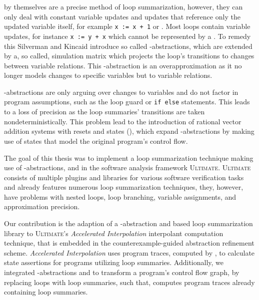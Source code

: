 \qvasr by themselves are a precise method of loop summarization, however, they can only deal with constant variable updates and updates that reference only the updated variable itself, for example \texttt{x := x + 1} or . Most loops contain variable updates, for instance \texttt{x := y + x} which cannot be represented by a \qvasr. To remedy this Silverman and Kincaid introduce so called \qvasr-abstractions, which are \qvasr extended by a, so called, simulation matrix which projects the loop's transitions to changes between variable relations. This \qvasr-abstraction is an overapproximation as it no longer models changes to specific variables but to variable relations.\\ \par

\qvasr-abstractions are only arguing over changes to variables and do not factor in program assumptions, such as the loop guard or \texttt{if else} statements. This leads to a loss of precision as the loop summaries' transitions are taken nondeterministically. This problem lead to the introduction of rational vector addition systems with resets and states (\qvasr), which expand \qvasr-abstractions by making use of states that model the original program's control flow.\\ \par

The goal of this thesis was to implement a loop summarization technique making use of \qvasr-abstractions, and \qvasrs in the software analysis framework \textsc{Ultimate}\cite{Zitat02}.
\textsc{Ultimate} consists of multiple plugins and libraries for various software verification tasks and already features numerous loop summarization techniques, they, however, have problems with nested loops, loop branching, variable assignments, and approximation precision.\\  \par
Our contribution is the adaption of a \qvasr-abstraction and \qvasrs based loop summarization library to \textsc{Ultimate}'s \textsl{Accelerated Interpolation} interpolant computation technique, that is embedded in the \traceabstraction \cite{10.1007/978-3-642-03237-0_7} counterexample-guided abstraction refinement scheme. \textsl{Accelerated Interpolation} uses program traces, computed by \traceabstraction, to calculate state assertions for programs utilizing loop summaries. Additionally, we integrated \qvasr-abstractions and \qvasrs to transform a program's control flow graph, by replacing loops with loop summaries, such that, \traceabstraction computes program traces already containing loop summaries.\\ \par

